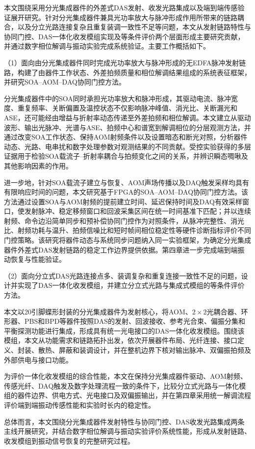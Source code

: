 本文围绕采用分光集成器件的外差式DAS发射、收发光路集成以及端到端传感验证展开研究。针对分光集成器件兼具光功率放大与脉冲形成作用所带来的链路耦合，以及分立光路连接复杂且重复装调一致性不足等问题，本文从发射链路特性与协同门控、DAS一体化收发模组实现及等条件评价两个层面形成主要研究贡献，并通过数字相位解调与振动实验完成系统验证。主要工作概括如下。

（1）面向由分光集成器件同时完成光功率放大与脉冲形成的无EDFA脉冲发射链路，构建了由器件工作状态、外差拍频质量和相位解调结果组成的系统表征框架，并研究SOA--AOM--DAQ协同门控方法。

分光集成器件中的SOA同时承担光功率放大和脉冲形成，其驱动电流、脉冲宽度、重复频率、关断偏置及温控状态不仅影响脉冲峰值、消光比、关断漏光和ASE，还可能经由增益与折射率动态传递至外差拍频和相位解调。本文建立从驱动波形、输出光脉冲、光谱与ASE、拍频中心和谱宽到解调相位的分层观测方法，并通过改变SOA工作状态、保持AOM射频条件以及设置暗态和断光对照，分析器件动态、光路、电串扰和数字处理参数对观测结果的不同贡献。受控实验获得的多层证据用于检验SOA载流子--折射率耦合与拍频变化之间的关系，并辨识瞬态啁啾及其他影响因素的作用。

进一步地，针对SOA载流子建立与恢复、AOM声场传播以及DAQ触发采样均具有有限响应时间的问题，本文研究基于FPGA的SOA--AOM--DAQ协同门控方法。该方法通过设置SOA与AOM射频的提前建立时间、延迟保持时间及DAQ有效采样窗口，使发射脉冲、稳定移频窗口和回波采集区间在统一时间基准下匹配；并以连续射频、命令边沿简单同步和预补偿协同门控作为对照条件，从脉冲完整性、消光比、射频功耗与温升、拍频信噪比和短时帧间相位稳定性等硬件诊断指标评价不同门控策略。该研究将器件动态与系统同步问题纳入同一实验框架，为确定分光集成器件外差式DAS发射链路的稳定工作边界提供依据。第四章进一步完成端到端振动恢复与性能验证。

（2）面向分立式DAS光路连接点多、装调复杂和重复连接一致性不足的问题，设计并实现了DAS一体化收发模组，并建立分立式光路与集成式模组的等条件评价方法。

本文以20引脚蝶形封装的分光集成器件为发射核心，将AOM、$2\times2$光耦合器、环形器、PBS和BPD等器件按照DAS的发射、回波接收、参考光合束、偏振分集和平衡探测功能进行集成，形成具有统一光电接口的DAS一体化收发模组。围绕该模组，本文从功能需求和链路拓扑出发，依次开展器件布局、光纤连接、接口定义、封装、散热、屏蔽和装调设计，并在整机边界下核对输出脉冲、双偏振拍频及外部供电与接口功能。

为评价一体化收发模组的综合性能，本文在保持分光集成器件驱动、AOM射频、传感光纤、DAQ触发及数字处理流程一致的条件下，比较分立式光路与一体化模组的器件边界、供电方式、光电接口及双偏振输出，并在第四章采用统一解调流程评价端到端振动传感性能和实验时长内的稳定性。

总体而言，本文围绕分光集成器件发射特性与协同门控、DAS收发光路集成两条主线开展研究，并结合数字相位解调与振动实验评价系统性能，形成从发射链路、收发模组到振动信号恢复的完整研究过程。
